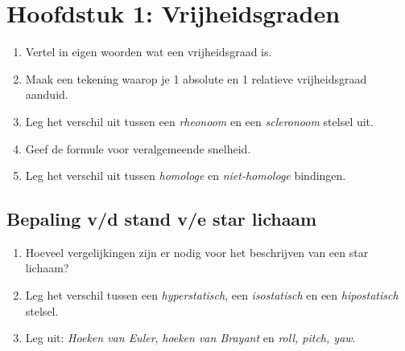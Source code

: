 \documentclass[12pt]{article}
\begin{document}
    \maketitle

	\section{Hoofdstuk 1: Vrijheidsgraden}%
	\label{sec:Hoofdstuk_1}
	\begin{enumerate}
		\item Vertel in eigen woorden wat een vrijheidsgraad is.
		\item Maak een tekening waarop je 1 absolute en 1 relatieve vrijheidsgraad aanduid.
		\item Leg het verschil uit tussen een \emph{rheonoom} en een \emph{scleronoom} stelsel uit.
		\item Geef de formule voor veralgemeende snelheid.
		\item Leg het verschil uit tussen \emph{homologe} en \emph{niet-homologe} bindingen.
	\end{enumerate}

	\subsection{Bepaling v/d stand v/e star lichaam}%
	\label{sub:Bepaling_v/d_stand_v/e_star_lichaam}
	\begin{enumerate}
		\item Hoeveel vergelijkingen zijn er nodig voor het beschrijven van een star lichaam?
		\item Leg het verschil tussen een \emph{hyperstatisch}, een \emph{isostatisch} en een \emph{hipostatisch} stelsel.
		\item Leg uit: \emph{Hoeken van Euler}, \emph{hoeken van Brayant} en \emph{roll, pitch, yaw}.
	\end{enumerate}
	
\end{document}
